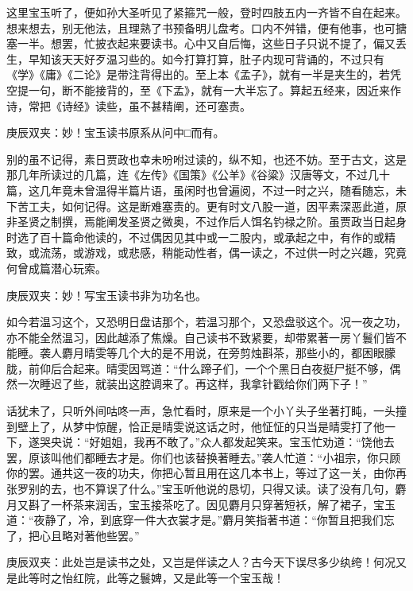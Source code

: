 \begin{parag}
    这里宝玉听了，便如孙大圣听见了紧箍咒一般，登时四肢五内一齐皆不自在起来。想来想去，别无他法，且理熟了书预备明儿盘考。口内不舛错，便有他事，也可搪塞一半。想罢，忙披衣起来要读书。心中又自后悔，这些日子只说不提了，偏又丢生，早知该天天好歹温习些的。如今打算打算，肚子内现可背诵的，不过只有《学》《庸》《二论》是带注背得出的。至上本《孟子》，就有一半是夹生的，若凭空提一句，断不能接背的，至《下孟》，就有一大半忘了。算起五经来，因近来作诗，常把《诗经》读些，虽不甚精阐，还可塞责。\begin{note}庚辰双夹：妙！宝玉读书原系从问中□而有。\end{note}别的虽不记得，素日贾政也幸未吩咐过读的，纵不知，也还不妨。至于古文，这是那几年所读过的几篇，连《左传》《国策》《公羊》《谷粱》汉唐等文，不过几十篇，这几年竟未曾温得半篇片语，虽闲时也曾遍阅，不过一时之兴，随看随忘，未下苦工夫，如何记得。这是断难塞责的。更有时文八股一道，因平素深恶此道，原非圣贤之制撰，焉能阐发圣贤之微奥，不过作后人饵名钓禄之阶。虽贾政当日起身时选了百十篇命他读的，不过偶因见其中或一二股内，或承起之中，有作的或精致，或流荡，或游戏，或悲感，稍能动性者，偶一读之，不过供一时之兴趣，究竟何曾成篇潜心玩索。\begin{note}庚辰双夹：妙！写宝玉读书非为功名也。\end{note}如今若温习这个，又恐明日盘诘那个，若温习那个，又恐盘驳这个。况一夜之功，亦不能全然温习，因此越添了焦燥。自己读书不致紧要，却带累著一房丫鬟们皆不能睡。袭人麝月晴雯等几个大的是不用说，在旁剪烛斟茶，那些小的，都困眼朦胧，前仰后合起来。晴雯因骂道：“什么蹄子们，一个个黑日白夜挺尸挺不够，偶然一次睡迟了些，就装出这腔调来了。再这样，我拿针戳给你们两下子！”
\end{parag}


\begin{parag}
    话犹未了，只听外间咕咚一声，急忙看时，原来是一个小丫头子坐著打盹，一头撞到壁上了，从梦中惊醒，恰正是晴雯说这话之时，他怔怔的只当是晴雯打了他一下，遂哭央说：“好姐姐，我再不敢了。”众人都发起笑来。宝玉忙劝道：“饶他去罢，原该叫他们都睡去才是。你们也该替换著睡去。”袭人忙道：“小祖宗，你只顾你的罢。通共这一夜的功夫，你把心暂且用在这几本书上，等过了这一关，由你再张罗别的去，也不算误了什么。”宝玉听他说的恳切，只得又读。读了没有几句，麝月又斟了一杯茶来润舌，宝玉接茶吃了。因见麝月只穿著短袄，解了裙子，宝玉道：“夜静了，冷，到底穿一件大衣裳才是。”麝月笑指著书道：“你暂且把我们忘了，把心且略对著他些罢。”\begin{note}庚辰双夹：此处岂是读书之处，又岂是伴读之人？古今天下误尽多少纨绔！何况又是此等时之怡红院，此等之鬟婢，又是此等一个宝玉哉！\end{note}
\end{parag}


